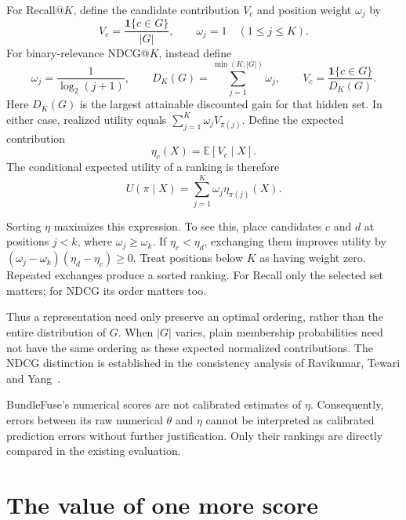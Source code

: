 \documentclass[11pt,a4paper]{article}
\newcommand{\E}{\mathbb E}
\newcommand{\ind}{\mathbf 1}
\begin{document}
For Recall@$K$, define the candidate contribution $V_c$ and position weight
$\omega_j$ by
\begin{equation}
 V_c=\frac{\ind\{c\in G\}}{|G|},\qquad \omega_j=1\quad(1\leq j\leq K).
 \label{eq:recalltarget}
\end{equation}
For binary-relevance NDCG@$K$, instead define
\begin{equation}
 \omega_j=\frac1{\log_2(j+1)},\qquad
 D_K(G)=\sum_{j=1}^{\min(K,|G|)}\omega_j,\qquad
 V_c=\frac{\ind\{c\in G\}}{D_K(G)}.
 \label{eq:ndcgtarget}
\end{equation}
Here $D_K(G)$ is the largest attainable discounted gain for that hidden set.
In either case, realized utility equals $\sum_{j=1}^K\omega_jV_{\pi(j)}$.
Define the expected contribution
\begin{equation}
 \eta_c(X)=\E[V_c\mid X].
\end{equation}
The conditional expected utility of a ranking is therefore
\begin{equation}
 U(\pi\mid X)=\sum_{j=1}^K\omega_j\eta_{\pi(j)}(X).
 \label{eq:expectedutility}
\end{equation}

Sorting $\eta$ maximizes this expression. To see this, place candidates $c$
and $d$ at positions $j<k$, where $\omega_j\geq\omega_k$. If
$\eta_c<\eta_d$, exchanging them improves utility by
$(\omega_j-\omega_k)(\eta_d-\eta_c)\geq0$. Treat positions below $K$ as
having weight zero. Repeated exchanges produce a sorted ranking.
For Recall only the selected set matters; for NDCG its order matters too.

Thus a representation need only preserve an optimal ordering, rather than
the entire distribution of $G$. When $|G|$ varies, plain membership
probabilities need not have the same ordering as these expected normalized
contributions. The NDCG distinction is established in the consistency
analysis of Ravikumar, Tewari and Yang~\cite{ravikumar2011}.

BundleFuse's numerical scores are not calibrated estimates of $\eta$.
Consequently, errors between its raw numerical $\theta$ and $\eta$ cannot
be interpreted as calibrated prediction errors without further justification.
Only their rankings are directly compared in the existing evaluation.

\section{The value of one more score}
\label{sec:additional}
\end{document}

